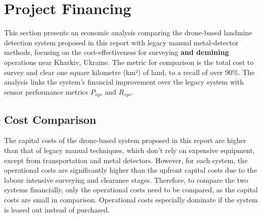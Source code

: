 \newpage
{}
\section{Project Financing} \label{financing}

This section presents an economic analysis comparing the drone-based landmine detection system proposed in this report with legacy manual metal-detector methods, focusing on the cost-effectiveness for surveying \textbf{and demining} operations near Kharkiv, Ukraine. The metric for comparison is the total cost to survey and clear one square kilometre (km²) of land, to a recall of over 90\%. The analysis links the system's financial improvement over the legacy system with sensor performance metrics $P_{sys}$ and $R_{sys}$.


\subsection{Cost Comparison} \label{subsec:cost_structures}

The capital costs of the drone-based system proposed in this report are higher than that of legacy manual techniques, which don't rely on expensive equipment, except from transportation and metal detectors. However, for each system, the operational costs are significantly higher than the upfront capital costs due to the labour intensive surveying and clearance stages. Therefore, to compare the two systems financially, only the operational costs need to be compared, as the capital costs are small in comparison. Operational costs especially dominate if the system is leased out instead of purchased.

